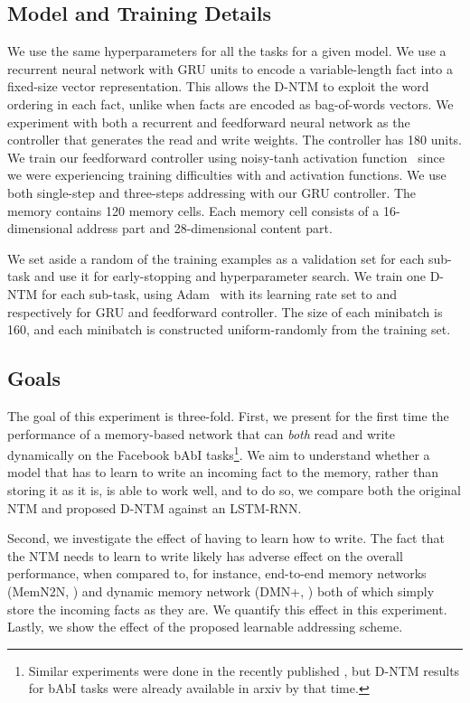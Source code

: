 \documentclass[12pt]{article}
\begin{document}
\subsection{Model and Training Details}

We use the same hyperparameters for all the tasks for a given model. We use a recurrent neural network with GRU units to encode a variable-length
fact into a fixed-size vector representation. This allows the D-NTM to exploit
the word ordering in each fact, unlike when facts are encoded as bag-of-words
vectors. We experiment with both a recurrent and feedforward neural network as the controller that generates the read and write weights. The controller has 180 units.
We train our feedforward controller using noisy-tanh activation function~\citep{gulcehre2016noisy} since we were experiencing training difficulties with  and  activation functions. We use both single-step and three-steps addressing with our GRU controller. The memory contains 120 memory cells. Each memory cell consists of a 16-dimensional address part and 28-dimensional content part.

We set aside a random  of the training examples as a validation set for each
sub-task and use it for early-stopping and hyperparameter search. We train one
D-NTM for each sub-task, using Adam~\citep{adam} with its learning rate set to
 and  respectively for GRU and feedforward controller. The size of each 
minibatch is 160, and each minibatch is constructed uniform-randomly from the training set. 


\subsection{Goals}

The goal of this experiment is three-fold. First, we present for the first time the performance of a memory-based network that can {\it both} read and write dynamically on the Facebook bAbI tasks\footnote{Similar experiments were done in the recently published \citep{graves2016hybrid}, but D-NTM results for bAbI tasks were already available in arxiv by that time.}. We aim to understand whether a model that has to learn to write an incoming fact to the memory, rather than storing it as it is, is able to work well, and to do so, we compare both the original NTM and proposed D-NTM against an LSTM-RNN. 

Second, we investigate the effect of having to learn how to write. The fact that the NTM needs to learn to write likely has adverse effect on the overall performance, when compared to, for instance, end-to-end memory networks (MemN2N, \citep{sukhbaatarend}) and dynamic memory network (DMN+, \citep{dmn2}) both of which simply store the incoming facts as they are. We quantify this effect in this experiment. Lastly, we show the effect of the proposed learnable addressing scheme. 
\end{document}
